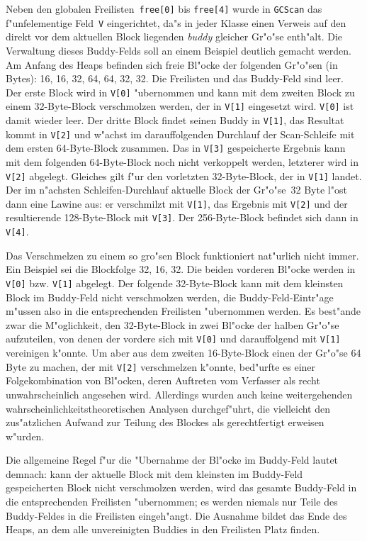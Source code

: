 Neben den globalen Freilisten~{\tt free[0]} bis {\tt free[4]} wurde
in {\tt GCScan} das f"unfelementige Feld~{\tt V} eingerichtet, da"s
in jeder Klasse einen Verweis auf den direkt vor dem aktuellen
Block liegenden {\it buddy\/} gleicher Gr"o"se enth"alt.
Die Verwaltung dieses Buddy-Felds soll an einem Beispiel deutlich gemacht
werden.
Am Anfang des Heaps befinden sich freie Bl"ocke der folgenden Gr"o"sen (in Bytes):
16, 16, 32, 64, 64, 32, 32.
Die Freilisten und das Buddy-Feld sind leer.
Der erste Block wird in {\tt V[0]} "ubernommen und kann mit dem zweiten Block zu
einem 32-Byte-Block verschmolzen werden, der in {\tt V[1]} eingesetzt wird.
{\tt V[0]} ist damit wieder leer.
Der dritte Block findet seinen Buddy in {\tt V[1]}, das Resultat kommt in
{\tt V[2]} und w"achst im darauffolgenden Durchlauf der Scan-Schleife mit
dem ersten 64-Byte-Block zusammen.
Das in {\tt V[3]} gespeicherte Ergebnis kann mit dem folgenden 64-Byte-Block
noch nicht verkoppelt werden, letzterer wird in {\tt V[2]} abgelegt.
Gleiches gilt f"ur den vorletzten 32-Byte-Block, der in {\tt V[1]} landet.
Der im n"achsten Schleifen-Durchlauf aktuelle Block der Gr"o"se~32 Byte l"ost
dann eine Lawine aus: er verschmilzt mit {\tt V[1]}, das Ergebnis mit {\tt V[2]}
und der resultierende 128-Byte-Block mit {\tt V[3]}.
Der 256-Byte-Block befindet sich dann in {\tt V[4]}.

Das Verschmelzen zu einem so gro"sen Block funktioniert nat"urlich nicht
immer.
Ein Beispiel sei die Blockfolge 32, 16, 32.
Die beiden vorderen Bl"ocke werden in {\tt V[0]} bzw. {\tt V[1]} abgelegt.
Der folgende 32-Byte-Block kann mit dem kleinsten Block im Buddy-Feld
nicht verschmolzen werden, die Buddy-Feld-Eintr"age m"ussen also in die
entsprechenden Freilisten "ubernommen werden.
Es best"ande zwar die M"oglichkeit, den 32-Byte-Block in zwei Bl"ocke der
halben Gr"o"se aufzuteilen, von denen der vordere sich mit {\tt V[0]} und darauffolgend
mit {\tt V[1]} vereinigen k"onnte.
Um aber aus dem zweiten 16-Byte-Block einen der Gr"o"se 64 Byte zu machen, der
mit {\tt V[2]} verschmelzen k"onnte, bed"urfte es einer Folgekombination
von Bl"ocken, deren Auftreten vom Verfasser als recht unwahrscheinlich angesehen
wird.
Allerdings wurden auch keine weitergehenden wahrscheinlichkeitstheoretischen
Analysen durchgef"uhrt, die vielleicht den zus"atzlichen Aufwand zur Teilung
des Blockes als gerechtfertigt erweisen w"urden.

Die allgemeine Regel f"ur die "Ubernahme der Bl"ocke im Buddy-Feld lautet
demnach: kann der aktuelle Block mit dem kleinsten im Buddy-Feld gespeicherten
Block nicht verschmolzen werden, wird das gesamte Buddy-Feld in die entsprechenden
Freilisten "ubernommen; es werden niemals nur Teile des Buddy-Feldes in die
Freilisten eingeh"angt.
Die Ausnahme bildet das Ende des Heaps, an dem alle unvereinigten Buddies in
den Freilisten Platz finden.


